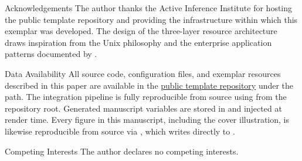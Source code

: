 \documentclass[
  ignorenonframetext,
]{beamer}
\begin{document}
\begin{frame}[allowframebreaks]{Acknowledgements}
\protect{}\label{acknowledgements}
The author thanks the Active Inference Institute for hosting the public
template repository and providing the infrastructure within which this
exemplar was developed. The design of the three-layer resource
architecture draws inspiration from the Unix philosophy
 and the enterprise application patterns documented
by .
\end{frame}

\begin{frame}{Data Availability}
\protect{}\label{data-availability}
All source code, configuration files, and exemplar resources described
in this paper are available in the
\href{https://github.com/docxology/template}{public template repository}
under the 
path. The integration pipeline is fully reproducible from source using
from the repository root. Generated manuscript variables are stored in
 and injected at render
time. Every figure in this manuscript, including the cover illustration,
is likewise reproducible from source via
,
which writes directly to .
\end{frame}

\begin{frame}[allowframebreaks]{Competing Interests}
\protect{}\label{competing-interests}
The author declares no competing interests.
\end{frame}
\end{document}
